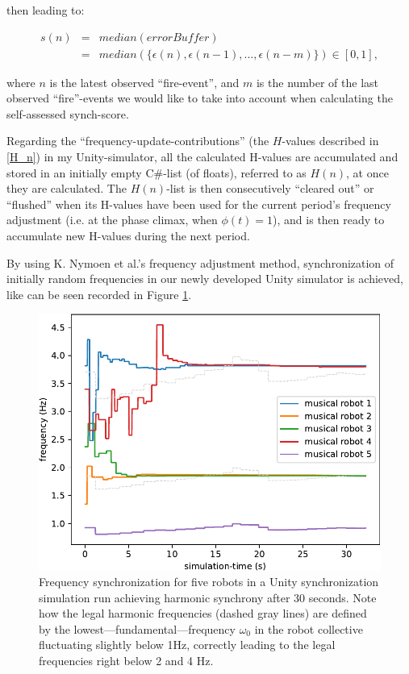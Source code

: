 	then leading to:
	
	\begin{equation}
	\label{self_assessed_synch}
		\begin{array}{rrclcl}
		s(n) & = & median(errorBuffer) \\ 
		& = & median(\{\epsilon(n), \epsilon(n-1), ... , \epsilon(n-m)\}) \in [0, 1],
		\end{array}
	\end{equation} \nl
	
	where $n$ is the latest observed ``fire-event'', and $m$ is the number of the last observed ``fire''-events we would like to take into account when calculating the self-assessed synch-score. \nl
	
	Regarding the ``frequency-update-contributions'' (the $H$-values described in \ref{H_n}) in my Unity-simulator, all the calculated H-values are accumulated and stored in an initially empty C\#-list (of floats), referred to as $H(n)$, at once they are calculated. The $H(n)$-list is then consecutively ``cleared out'' or ``flushed'' when its H-values have been used for the current period's frequency adjustment (i.e. at the phase climax, when $\phi(t)=1$), and is then ready to accumulate new H-values during the next period.
	
	By using K. Nymoen et al.'s frequency adjustment method, synchronization of initially random frequencies in our newly developed Unity simulator is achieved, like can be seen recorded in Figure \ref{fig:frequency_synch}.
	
	\begin{figure}
		\centering
		\includegraphics[width=\linewidth]{Assets/DocSegments/Chapters/Implementation/Figures/Plots/FrequencySynchronizationPlot.pdf}
		\caption{Frequency synchronization for five robots in a Unity synchronization simulation run achieving harmonic synchrony after 30 seconds. Note how the legal harmonic frequencies (dashed gray lines) are defined by the lowest—fundamental—frequency $\omega_0$ in the robot collective fluctuating slightly below 1Hz, correctly leading to the legal frequencies right below 2 and 4 Hz.}
		\label{fig:frequency_synch}
	\end{figure}
	
